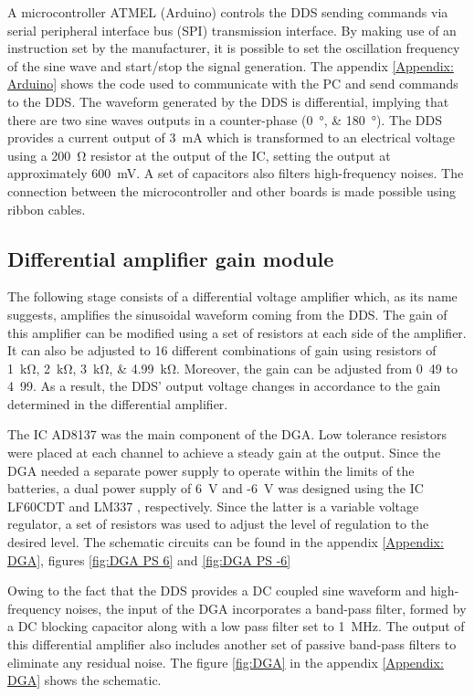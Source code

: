 A microcontroller ATMEL (Arduino) controls the DDS sending commands via serial peripheral interface bus (SPI) transmission interface. By making use of an instruction set by the manufacturer, it is possible to set the oscillation frequency of the sine wave and start/stop the signal generation. The appendix \ref{Appendix: Arduino} shows the code used to communicate with the PC and send commands to the DDS. The waveform generated by the DDS is differential, implying that there are two sine waves outputs in a counter-phase (\SIlist{0;180}{\degree}). The DDS provides a current output of \SI{3}{\mA} which is transformed to an electrical voltage using a \SI{200}{\ohm} resistor at the output of the IC, setting the output at approximately \SI{600}{\mV}. A set of capacitors also filters high-frequency noises. The connection between the microcontroller and other boards is made possible using ribbon cables. 

\subsection{Differential amplifier gain module}
The following stage consists of a differential voltage amplifier which, as its name suggests, amplifies the sinusoidal waveform coming from the DDS. The gain of this amplifier can be modified using a set of resistors at each side of the amplifier. It can also be adjusted to 16 different combinations of gain using resistors of \SIlist{1;2;3;4.99}{\kohm}. Moreover, the gain can be adjusted from \si{0.49} to \si{4.99}. As a result, the DDS' output voltage changes in accordance to the gain determined in the differential amplifier. 

The IC AD8137 \cite{ad:AD8137} was the main component of the DGA. Low tolerance resistors were placed at each channel to achieve a steady gain at the output. Since the DGA needed a separate power supply to operate within the limits of the batteries, a dual power supply of \SI{6}{\volt} and -\SI{6}{\volt} was designed using the IC LF60CDT \cite{st:LFXX} and LM337 \cite{ti:LMx37}, respectively. Since the latter is a variable voltage regulator, a set of resistors was used to adjust the level of regulation to the desired level. The schematic circuits can be found in the appendix \ref{Appendix: DGA}, figures \ref{fig:DGA PS 6} and \ref{fig:DGA PS -6}

Owing to the fact that the DDS provides a DC coupled sine waveform and high-frequency noises, the input of the DGA incorporates a band-pass filter, formed by a DC blocking capacitor along with a low pass filter set to \SI{1}{\mega\hertz}. The output of this differential amplifier also includes another set of passive band-pass filters to eliminate any residual noise. The figure \ref{fig:DGA} in the appendix \ref{Appendix: DGA} shows the schematic. 

